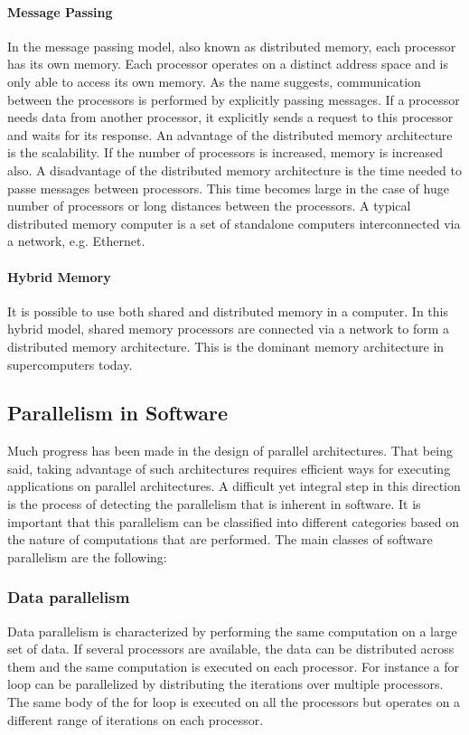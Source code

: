 \paragraph{Message Passing}

In the message passing model, also known as distributed memory, each processor has its own memory. Each processor operates on a distinct address space and is only able to access its own memory. As the name suggests, communication between the processors is performed by explicitly passing messages. If a processor needs data from another processor, it explicitly sends a request to this processor and waits for its response. An advantage of the distributed memory architecture is the scalability. If the number of processors is increased, memory is increased also. A disadvantage of the distributed memory architecture is the time needed to passe messages between processors. This time becomes large in the case of huge number of processors or long distances between the processors. A typical distributed memory computer is a set of standalone computers interconnected via a network, e.g. Ethernet.

\paragraph{Hybrid Memory}

It is possible to use both shared and distributed memory in a computer. In this hybrid model, shared memory processors are connected via a network to form a distributed memory architecture. This is the dominant memory architecture in supercomputers today.

\subsection{Parallelism in Software}

Much progress has been made in the design of parallel architectures. That being said, taking advantage of such architectures requires efficient ways for executing applications on parallel architectures. A difficult yet integral step in this direction is the process of detecting the parallelism that is inherent in software. It is important that this parallelism can be classified into different categories based on the nature of computations that are performed. The main classes of software parallelism are the following:    

\subsubsection{Data parallelism}
Data parallelism is characterized by performing the same computation on a large set of data. If several processors are available, the data can be distributed across them and the same computation is executed on each processor. For instance a for loop can be parallelized by distributing the iterations over multiple processors. The same body of the for loop is executed on all the processors but operates on a different range of iterations on each processor.

